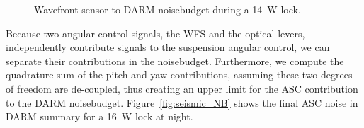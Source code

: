 \begin{figure}
\begin{centering}
\caption[Wavefront sensor to DARM noisebudget]{Wavefront sensor to
  DARM noisebudget during a 14~W lock.} %
\label{fig:wfs2DARM}
\end{centering}
\end{figure}

Because two angular control signals, the WFS and the optical levers,
independently contribute signals to the suspension angular control, we
can separate their contributions in the noisebudget. Furthermore, we
compute the quadrature sum of the pitch and yaw contributions,
assuming these two degrees of freedom are de-coupled, thus creating an
upper limit for the ASC contribution to the DARM
noisebudget. Figure~\ref{fig:seismic_NB} shows the final ASC noise in
DARM summary for a 16~W lock at night.


